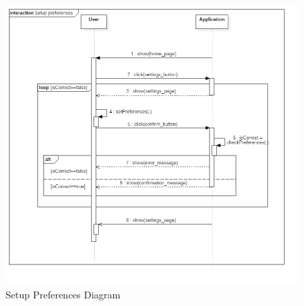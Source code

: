 \clearpage
\begin{figure}[!h]
\centering
\includegraphics[scale=0.6]{images/SetupPreferencesDiagram}
\caption{Setup Preferences Diagram}
\label{ref:setupprefencesdiagram}
\end{figure}
